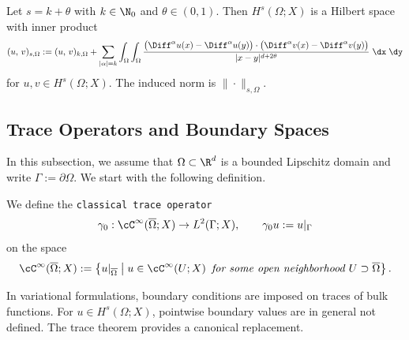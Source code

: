\begin{proposition}
	Let $s=k+\theta$ with $k\in\N_0$ and $\theta\in(0,1)$. Then $H^s(\Omega;X)$ is a Hilbert space with inner product
	\begin{equation*}
		(u,\,v)_{s,\Omega}
		:=
		(u,\,v)_{k,\Omega}
		+
		\sum_{|\alpha|=k}
		\int_\Omega\int_\Omega
		\frac{\big(\Diff^\alpha u(x)-\Diff^\alpha u(y)\big)\cdot\big(\Diff^\alpha v(x)-\Diff^\alpha v(y)\big)}
		{|x-y|^{d+2\theta}}\;\dx\;\dy
	\end{equation*}
	for $u,v\in H^s(\Omega;X)$. The induced norm is $\|\cdot\|_{s,\Omega}$.
	\eop
\end{proposition}

\subsection{Trace Operators and Boundary Spaces}

In this subsection, we assume that $\Omega\subset\R^d$ is a bounded Lipschitz domain and write $\Gamma:=\partial\Omega$. We start with the following definition.

\begin{definition}
	We define the {\tt classical trace operator}
	\begin{equation*}
		\gamma_0:\cC^\infty(\overline{\Omega};X)\to L^2(\Gamma;X),
		\qquad
		\gamma_0 u:=u|_\Gamma
	\end{equation*}
	on the space
	\begin{equation*}
		\cC^\infty(\overline{\Omega};X)
		:=
		\left\{u|_{\overline{\Omega}}\;\middle|\;u\in \cC^\infty(U;X)\text{\em\enspace for some open neighborhood }U\supset\overline{\Omega}\right\}.
	\end{equation*}
\end{definition}

In variational formulations, boundary conditions are imposed on traces of bulk functions. For $u\in H^s(\Omega;X)$, pointwise boundary values are in general not defined. The trace theorem provides a canonical replacement.

